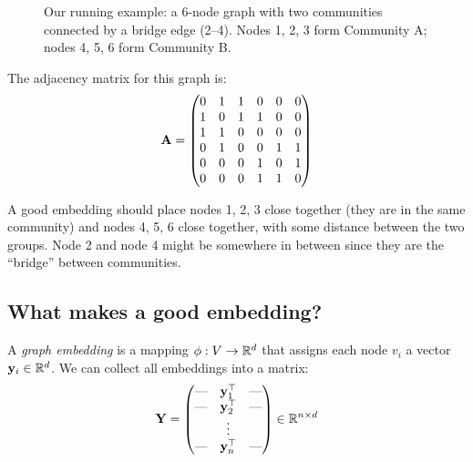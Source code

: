 \begin{notechapter}
\begin{figure}[htbp]
\caption{Our running example: a 6-node graph with two communities connected by a bridge edge (2--4). Nodes 1, 2, 3 form Community A; nodes 4, 5, 6 form Community B.}
\label{shallow-embeddings:fig:running_example}
\end{figure}

The adjacency matrix for this graph is:
\begin{equation}
\mathbf{A} = \begin{pmatrix}
0 & 1 & 1 & 0 & 0 & 0 \\
1 & 0 & 1 & 1 & 0 & 0 \\
1 & 1 & 0 & 0 & 0 & 0 \\
0 & 1 & 0 & 0 & 1 & 1 \\
0 & 0 & 0 & 1 & 0 & 1 \\
0 & 0 & 0 & 1 & 1 & 0
\end{pmatrix}
\label{shallow-embeddings:eq:adj_matrix}
\end{equation}

\begin{intuition}
A good embedding should place nodes 1, 2, 3 close together (they are in the same community) and nodes 4, 5, 6 close together, with some distance between the two groups. Node 2 and node 4 might be somewhere in between since they are the ``bridge'' between communities.
\end{intuition}

\subsection{What makes a good embedding?}

\begin{definition}
A \emph{graph embedding} is a mapping $\phi: V \to \mathbb{R}^d$ that assigns each node $v_i$ a vector $\mathbf{y}_i \in \mathbb{R}^d$. We can collect all embeddings into a matrix:
\[
\mathbf{Y} = \begin{pmatrix} \text{---} & \mathbf{y}_1^\top & \text{---} \\ \text{---} & \mathbf{y}_2^\top & \text{---} \\ & \vdots & \\ \text{---} & \mathbf{y}_n^\top & \text{---} \end{pmatrix} \in \mathbb{R}^{n \times d}
\]
\end{definition}


\end{notechapter}
